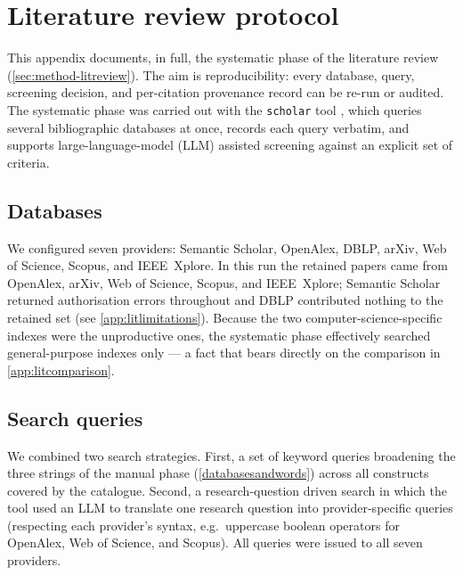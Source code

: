 \mode*
\section{Literature review protocol}
\label{app:litprotocol}

This appendix documents, in full, the systematic phase of the literature review
(\cref{sec:method-litreview}). The aim is reproducibility: every database, query,
screening decision, and per-citation provenance record can be re-run or audited.
The systematic phase was carried out with the \texttt{scholar} tool
\autocite{scholar}, which queries several bibliographic databases at once,
records each query verbatim, and supports large-language-model (LLM) assisted
screening against an explicit set of criteria.

\subsection{Databases}

We configured seven providers: Semantic Scholar, OpenAlex, DBLP, arXiv, Web of
Science, Scopus, and IEEE~Xplore. In this run the retained papers came from
OpenAlex, arXiv, Web of Science, Scopus, and IEEE~Xplore; Semantic Scholar
returned authorisation errors throughout and DBLP contributed nothing to the
retained set (see \cref{app:litlimitations}). Because the two
computer-science-specific indexes were the unproductive ones, the systematic
phase effectively searched general-purpose indexes only --- a fact that bears
directly on the comparison in \cref{app:litcomparison}.

\subsection{Search queries}

We combined two search strategies. First, a set of keyword queries broadening the
three strings of the manual phase (\cref{databasesandwords}) across all
constructs covered by the catalogue. Second, a research-question driven search in
which the tool used an LLM to translate one research question into
provider-specific queries (respecting each provider's syntax, e.g.\ uppercase
boolean operators for OpenAlex, Web of Science, and Scopus). All queries were
issued to all seven providers.


